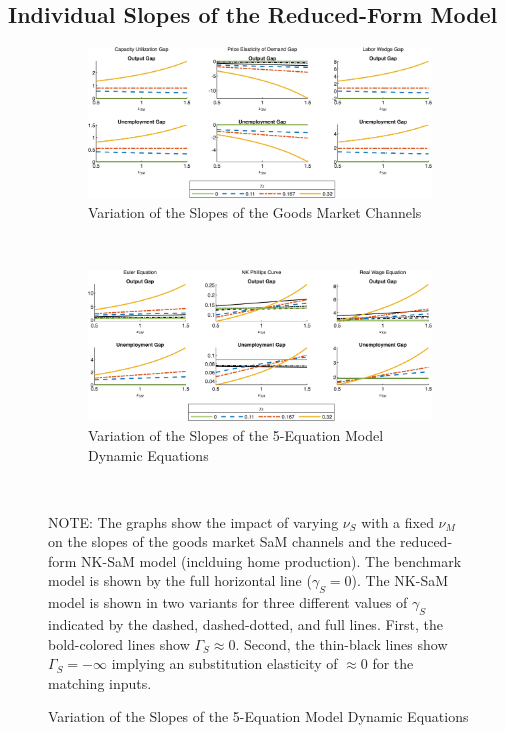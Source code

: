 \documentclass[12pt,3p,authoryear,review]{elsarticle}
\begin{document}
\subsection{Individual Slopes of the Reduced-Form Model}\label{sec:slopes_add_individual}%
\begin{figure}[h!]%
    \centering%
    \caption{Unemployment and Output Gap Slopes of the Reduced-Form NK-SaM Model}\label{fig:slopes_add_individual}%
    \begin{subfigure}{\textwidth}%
        \centering%
        \caption{Variation of the Slopes of the Goods Market Channels}\label{fig:app_slopes_tot_caput}%
        \includegraphics[width=\textwidth]{fig_10_slopes_5eq_ps_cu.png}%
    \end{subfigure}\\%
	\vspace{0.2in}%
    \begin{subfigure}{\textwidth}%
        \centering%
        \caption{Variation of the Slopes of the 5-Equation Model Dynamic Equations}\label{fig:app_slopes_tot_asad}%
        \includegraphics[width=\textwidth]{fig_11_slopes_5eq_asad.png}%
    \end{subfigure}\\%
    {\tiny \singlespacing NOTE: The graphs show the impact of varying $\nu_S$ with a fixed $\nu_M$ on the slopes of the goods market SaM channels and the reduced-form NK-SaM model (inclduing home production). The benchmark model is shown by the full horizontal line ($\gamma_S=0$). The NK-SaM model is shown in two variants for three different values of $\gamma_S$ indicated by the dashed, dashed-dotted, and full lines. First, the bold-colored lines show $\Gamma_S \approx 0$. Second, the thin-black lines show $\Gamma_S=-\infty$ implying an substitution elasticity of $\approx 0$ for the matching inputs.\par}%
\end{figure}%
\FloatBarrier%
\pagebreak%
\end{document}
